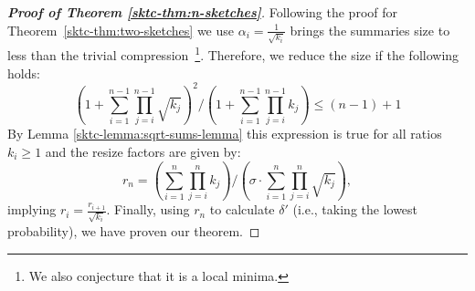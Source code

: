 \begin{proof}[\textbf{Proof of Theorem \ref{sktc-thm:n-sketches}}]
Following the proof for Theorem~\ref{sktc-thm:two-sketches} we use $\alpha_i = \frac{1}{\sqrt{k_i}}$ brings the summaries size to less than the trivial compression~\footnote{We also conjecture that it is a local minima.}.
Therefore, we reduce the size if the following holds:
\[  \left(1+\sum\limits_{i=1}^{n-1} \prod\limits_{j=i}^{n-1}\sqrt{k_j}\right)^2 / \left(1+\sum\limits_{i=1}^{n-1} \prod\limits_{j=i}^{n-1}k_j\right) \leq (n-1)+1\]
By Lemma \ref{sktc-lemma:sqrt-sums-lemma} this expression is true for all ratios $k_i \geq 1$
and the resize factors are given by:
\[ r_n = \left(\sum\limits_{i=1}^n \prod\limits_{j=i}^n k_j\right) / \left(\sigma \cdot \sum\limits_{i=1}^n {\prod\limits_{j=i}^n \sqrt{k_j}}\right),\]
implying $r_i = \frac{r_{i+1}}{\sqrt{k_i}}$. Finally, using $r_n$ to calculate $\delta'$ (i.e., taking the lowest probability), we have proven our theorem.
\end{proof}

